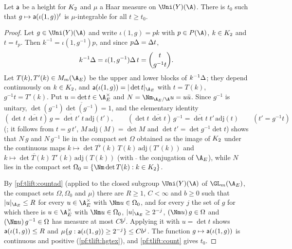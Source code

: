 \begin{proposition}\label{pf:tlift:hgtint}
Let $\mathsf{a}$ be a height for $K_2$ and $\mu$ a Haar measure on $\Uni(Y)(\A)$. There is $t_0$ such that
$g\mapsto\mathsf{a}(\iota(1,g))^t$ is $\mu$-integrable for all $t\ge t_0$.
\end{proposition}

\begin{proof}
Let $g\in\Uni(Y)(\A)$ and write $\iota(1,g)=pk$ with $p\in P(\A)$, $k\in K_2$ and $t=t_p$. Then
$k^{-1}=\iota(1,g^{-1})p$, and since $p\Delta=\Delta t$,
\begin{equation}\label{eq:tlift:rows}
  k^{-1}\Delta=\iota(1,g^{-1})\Delta\,t={t\choose g^{-1}t}.
\end{equation}
Let $T(k),T'(k)\in M_m(\tliftAE)$ be the upper and lower blocks of $k^{-1}\Delta$; they depend continuously on
$k\in K_2$, and $\tliftht(\iota(1,g))=|\det t|_{\tliftAE}$ with $t=T(k)$, $g^{-1}t=T'(k)$. Put
$u=\det t\in\tliftAE^\times$ and $N=\Nm_{\tliftAE/\A}u=u\bar u$. Since $g^{-1}$ is unitary,
$\det(g^{-1})\overline{\det(g^{-1})}=1$, and the elementary identity
\[
  (\det t\,\overline{\det t})\,g=\overline{\det t'}\;t\,\mathrm{adj}(t'),\qquad
  (\det t\,\overline{\det t})\,g^{-1}=\overline{\det t}\;t'\,\mathrm{adj}(t)\qquad(t'=g^{-1}t)
\]
(; it follows from $t=g\,t'$, $M\,\mathrm{adj}(M)=\det M$ and
$\det t'=\det g^{-1}\det t$) shows that $N\,g$ and $N\,g^{-1}$ lie in the compact set $\Omega$ obtained as the
image of $K_2$ under the continuous maps $k\mapsto\overline{\det T'(k)}\,T(k)\,\mathrm{adj}(T'(k))$ and
$k\mapsto\overline{\det T(k)}\,T'(k)\,\mathrm{adj}(T(k))$ (with $\bar{\ }$ the conjugation of $\tliftAE$), while $N$ lies in
the compact set $\Omega_0=\{\Nm\det T(k):k\in\tliftK\}$.

By \cref{pf:tlift:countad} (applied to the closed subgroup
$\Uni(Y)(\A)$ of $\GL_m(\tliftAE)$, the compact sets $\Omega,\Omega_0$ and $\mu$) there are $R\ge1$, $C<\infty$ and
$b\ge0$ such that $|u|_{\tliftAE}\le R$ for every $u\in\tliftAE^\times$ with $\Nm u\in\Omega_0$, and for every $j$ the set of $g$
for which there is $u\in\tliftAE^\times$ with $\Nm u\in\Omega_0$, $|u|_{\tliftAE}\ge2^{-j}$, $(\Nm u)\,g\in\Omega$ and $(\Nm u)\,g^{-1}\in\Omega$ has
measure at most $Cb^j$. Applying it with $u=\det t$ shows $\mathsf{a}(\iota(1,g))\le R$ and
$\mu\{g:\mathsf{a}(\iota(1,g))\ge2^{-j}\}\le Cb^j$. The function $g\mapsto\mathsf{a}(\iota(1,g))$ is continuous and
positive (\cref{pf:tlift:hgtex}), and \cref{pf:tlift:count} gives $t_0$.
\end{proof}

